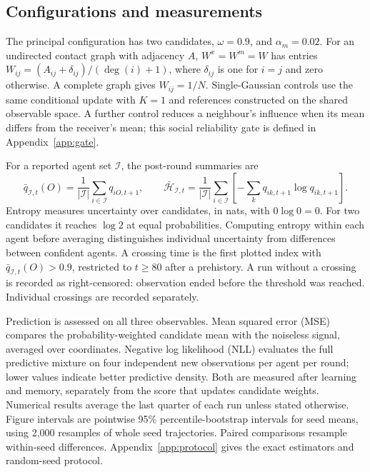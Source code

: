 \documentclass[runningheads]{llncs}
\begin{document}
\subsection{Configurations and measurements}
\label{sec:measurements}
The principal configuration has two candidates, $\omega=0.9$, and
$\alpha_m=0.02$. For an undirected contact graph with adjacency $A$,
$W^x=W^m=W$ has entries
$W_{ij}=(A_{ij}+\delta_{ij})/(\deg(i)+1)$, where $\delta_{ij}$ is one for
$i=j$ and zero otherwise. A complete graph gives $W_{ij}=1/N$.
Single-Gaussian controls use the same conditional update with $K=1$ and references
constructed on the shared observable space. A further control reduces a
neighbour's influence when its mean differs from the receiver's mean; this
social reliability gate is defined in Appendix~\ref{app:gate}.

For a reported agent set $\mathcal I$, the post-round summaries are
\begin{equation}
 \bar q_{\mathcal I,t}(O)=\frac1{|\mathcal I|}\sum_{i\in\mathcal I}q_{iO,t+1},\qquad
 \bar{\mathcal H}_{\mathcal I,t}=\frac1{|\mathcal I|}\sum_{i\in\mathcal I}
       \left[-\sum_kq_{ik,t+1}\log q_{ik,t+1}\right].
 \label{eq:readouts}
\end{equation}
Entropy measures uncertainty over candidates, in nats, with $0\log0=0$. For two
candidates it reaches $\log2$ at equal probabilities. Computing entropy within
each agent before averaging distinguishes individual uncertainty from differences
between confident agents. A crossing time is the first plotted index with
$\bar q_{\mathcal I,t}(O)>0.9$, restricted to $t\geq80$ after a prehistory.
A run without a crossing is recorded as right-censored: observation ended before
the threshold was reached. Individual crossings are recorded separately.

Prediction is assessed on all three observables. Mean squared error (MSE) compares
the probability-weighted candidate mean with the noiseless signal, averaged over
coordinates. Negative log likelihood (NLL) evaluates the full predictive mixture
on four independent new observations per agent per round; lower values indicate
better predictive density. Both are measured after learning and memory, separately
from the score that updates candidate weights. Numerical results average the last
quarter of each run unless stated otherwise. Figure intervals are pointwise
95\% percentile-bootstrap intervals for seed means, using 2,000 resamples of
whole seed trajectories. Paired comparisons resample within-seed differences.
Appendix~\ref{app:protocol} gives the exact estimators and random-seed protocol.
\end{document}
